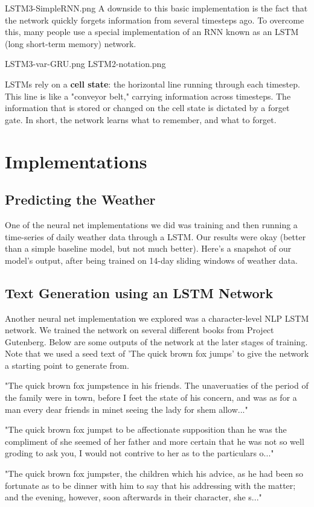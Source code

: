 \documentclass[]{article}
\begin{document}
  LSTM3-SimpleRNN.png
A downside to this basic implementation is the fact that the network quickly forgets information from several timesteps ago. To overcome this, many people use a special implementation of an RNN known as an LSTM (long short-term memory) network.

  LSTM3-var-GRU.png
  LSTM2-notation.png
  
LSTMs rely on a \textbf{cell state}: the horizontal line running through each timestep. This line is like a "conveyor belt," carrying information across timesteps. The information that is stored or changed on the cell state is dictated by a forget gate. In short, the network learns what to remember, and what to forget.

\section{Implementations}

\subsection{Predicting the Weather}

One of the neural net implementations we did was training and then running a time-series of daily weather data through a LSTM. Our results were okay (better than a simple baseline model, but not much better). Here's a snapshot of our model's output, after being trained on 14-day sliding windows of weather data.

\subsection{Text Generation using an LSTM Network}
Another neural net implementation we explored was a character-level NLP LSTM network. We trained the network on several different books from Project Gutenberg. Below are some outputs of the network at the later stages of training. Note that we used a seed text of 'The quick brown fox jumps' to give the network a starting point to generate from. 

"The quick brown fox jumpstence in his friends. The unaveruaties of the period of the family were in town, before I feet the state of his concern, and was as for a man every dear friends in minet seeing the lady for shem allow..."

"The quick brown fox jumpst to be affectionate supposition than he was the compliment of she seemed of her father and more certain that he was not so well groding to ask you, I would not contrive to her as to the particulars o..."

"The quick brown fox jumpster, the children which his advice, as he had been so fortunate as to be dinner with him to say that his addressing with the matter; and the evening, however, soon afterwards in their character, she s..."
\end{document}
